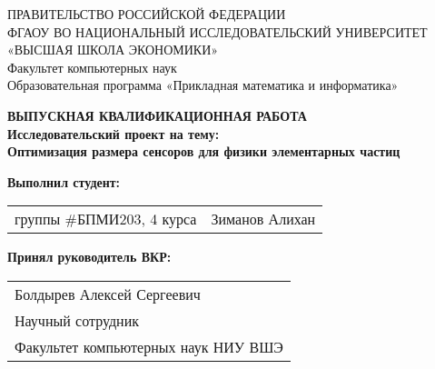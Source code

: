 \begin{titlepage}
\newpage

{
\begin{center}
ПРАВИТЕЛЬСТВО РОССИЙСКОЙ ФЕДЕРАЦИИ\\
ФГАОУ ВО НАЦИОНАЛЬНЫЙ ИССЛЕДОВАТЕЛЬСКИЙ УНИВЕРСИТЕТ\\
«ВЫСШАЯ ШКОЛА ЭКОНОМИКИ»
\\
\bigskip
Факультет компьютерных наук\\
Образовательная программа «Прикладная математика и информатика»
\end{center}
}

\vspace{7em}

\begin{center}
{\bf ВЫПУСКНАЯ КВАЛИФИКАЦИОННАЯ РАБОТА}\\
{\bf Исследовательский проект на тему:}\\
{\bf Оптимизация размера сенсоров для физики элементарных частиц}\\
\end{center}

\vspace{2em}

{\bf Выполнил студент: \vspace{2mm}}

{
\begin{tabular}{l@{\hskip 1.5cm}l}
группы \#БПМИ203, 4 курса & Зиманов Алихан
\end{tabular}}


\vspace{1em}
{\bf Принял руководитель ВКР: \vspace{2mm}}

{
\begin{tabular}{l}
Болдырев Алексей Сергеевич\\
Научный сотрудник\\
Факультет компьютерных наук НИУ ВШЭ 
\end{tabular}}


\end{titlepage}
